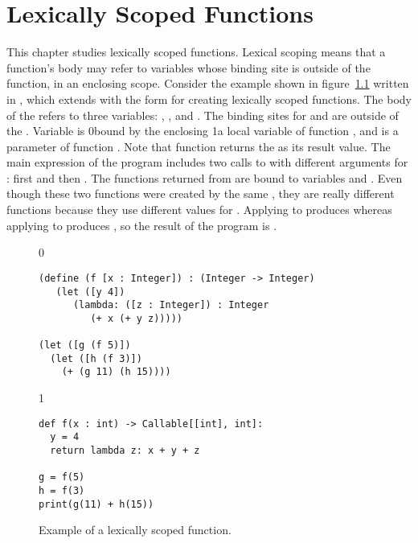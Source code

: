 \documentclass[7x10]{TimesAPriori_MIT}%
\def\racketEd{0}
\def\pythonEd{1}
\def\edition{1}
\newcommand{\racket}[1]{{\if\edition\racketEd{#1}\fi}}
\newcommand{\pythonColor}[0]{}
\newcommand{\python}[1]{{\if\edition\pythonEd\pythonColor #1\fi}}
\numberwithin{theorem}{chapter}
\numberwithin{definition}{chapter}
\numberwithin{equation}{chapter}
\begin{document}




\chapter{Lexically Scoped Functions}
\label{ch:Llambda}
\setcounter{footnote}{0}

This chapter studies lexically scoped functions. Lexical
scoping means that a function's body
may refer to variables whose binding site is outside of the function,
in an enclosing scope.
%
Consider the example shown in figure~\ref{fig:lexical-scoping} written
in \LangLam{}, which extends \LangFun{} with the
 form for creating lexically scoped
functions.  The body of the  refers to three variables:
, , and . The binding sites for  and
 are outside of the . Variable  is
\racket{bound by the enclosing }\python{a local variable of
  function }, and  is a parameter of function
. Note that function  returns the  as its
result value. The main expression of the program includes two calls to
 with different arguments for : first  and
then . The functions returned from  are bound to
variables  and . Even though these two functions were
created by the same , they are really different functions
because they use different values for . Applying  to
 produces  whereas applying  to 
produces , so the result of the program is .

\begin{figure}[btp]
\begin{tcolorbox}[colback=white]
{\if\edition\racketEd
\begin{lstlisting}
(define (f [x : Integer]) : (Integer -> Integer)
   (let ([y 4])
      (lambda: ([z : Integer]) : Integer
         (+ x (+ y z)))))

(let ([g (f 5)])
  (let ([h (f 3)])
    (+ (g 11) (h 15))))
\end{lstlisting}
\fi}
{\if\edition\pythonEd\pythonColor
\begin{lstlisting}
def f(x : int) -> Callable[[int], int]:
  y = 4
  return lambda z: x + y + z

g = f(5)
h = f(3)
print(g(11) + h(15))
\end{lstlisting}
\fi}
\end{tcolorbox}
\caption{Example of a lexically scoped function.}
\label{fig:lexical-scoping}
\end{figure}
\end{document}
